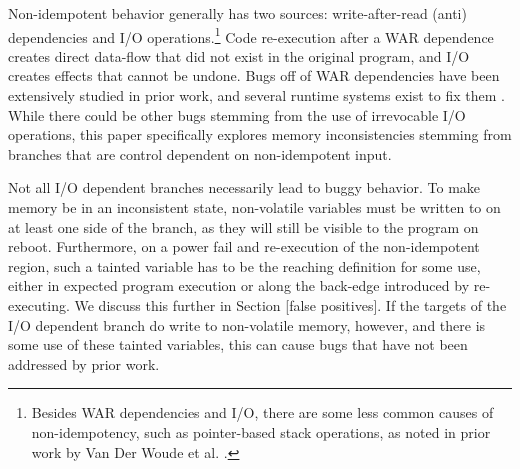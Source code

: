 Non-idempotent behavior generally has two sources: write-after-read (anti)
dependencies and I/O operations.\footnote{Besides WAR dependencies and I/O,
there are some less common causes of non-idempotency, such as pointer-based
stack operations, as noted in prior work by Van Der Woude et al.
\cite{ratchet}.} Code re-execution after a WAR dependence creates direct
data-flow that did not exist in the original program, and I/O creates effects
that cannot be undone. Bugs off of WAR dependencies have been extensively
studied in prior work, and several runtime systems exist to fix them
\cite{ratchet, alpaca, dino}. While there could be other bugs
stemming from the use of irrevocable I/O operations, this paper specifically
explores memory inconsistencies stemming from branches that are control
dependent on non-idempotent input.

Not all I/O dependent branches necessarily lead to buggy behavior. To make
memory be in an inconsistent state, non-volatile variables must be written to on
at least one side of the branch, as they will still be visible to the program on
reboot. Furthermore, on a power fail and re-execution of the non-idempotent
region, such a tainted variable has to be the reaching definition for some use,
either in expected program execution or along the back-edge introduced by
re-executing. We discuss this further in Section [false positives]. If the
targets of the I/O dependent branch do write to non-volatile memory, however,
and there is some use of these tainted variables, this can cause bugs that have
not been addressed by prior work.

	

